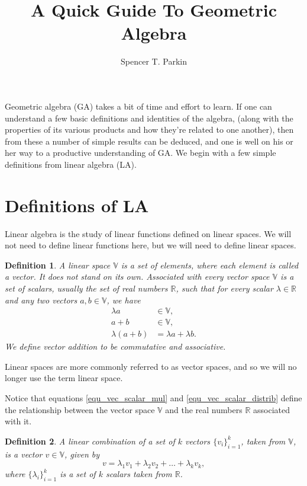 \documentclass[12pt]{article}
\title{A Quick Guide To Geometric Algebra}
\author{Spencer T. Parkin}
\numberwithin{equation}{section}
\newcommand{\V}{\mathbb{V}}
\newcommand{\R}{\mathbb{R}}
\newtheorem{definition}{Definition}[section]
\begin{document}
\maketitle

Geometric algebra (GA) takes a bit of time and effort to learn.  If one can
understand a few basic definitions and identities of the algebra, (along with the
properties of its various products and how they're related to one another), then
from these a number of simple results can be deduced, and one is well on his
or her way to a productive understanding of GA.
We begin with a few simple definitions from linear algebra (LA).

\section{Definitions of LA}

Linear algebra is the study of linear functions defined on linear spaces.  We will not need
to define linear functions here, but we will need to define linear spaces.
\begin{definition}\label{def_vec_space}
A linear space $\V$ is a set of elements, where each element is called a vector.  It does not stand on its own.
Associated with every vector space $\V$ is a set of scalars, usually the set of real numbers $\R$,
such that for every scalar $\lambda\in\R$ and any two vectors $a,b\in\V$, we have
\begin{align}
\lambda a &\in \V\label{equ_vec_scalar_mul}, \\
a+b &\in\V\label{equ_vec_addition}, \\
\lambda(a+b) &= \lambda a+\lambda b.\label{equ_vec_scalar_distrib}
\end{align}
We define vector addition to be commutative and associative.
\end{definition}
Linear spaces are more commonly referred to as vector spaces, and so we will no longer
use the term linear space.

Notice that equations \eqref{equ_vec_scalar_mul} and \eqref{equ_vec_scalar_distrib}
define the relationship between the
vector space $\V$ and the real numbers $\R$ associated with it.

\begin{definition}
A linear combination of a set of $k$ vectors $\{v_i\}_{i=1}^k$, taken from $\V$, is
a vector $v\in\V$, given by
\begin{equation}
v = \lambda_1 v_1 + \lambda_2 v_2 + \dots + \lambda_k v_k,
\end{equation}
where $\{\lambda_i\}_{i=1}^k$ is a set of $k$ scalars taken from $\R$.
\end{definition}
\end{document}
